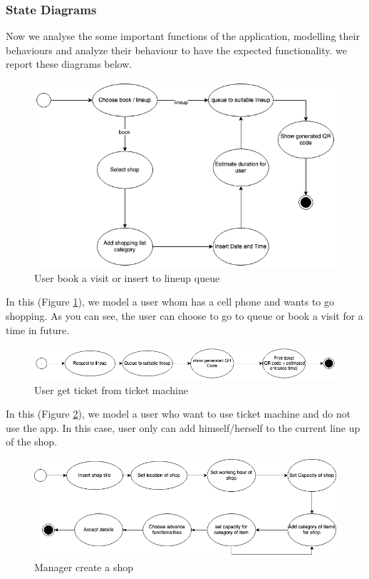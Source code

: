 \subsubsection{State Diagrams}
Now we analyse the some important functions of the application, modelling their behaviours and analyze their behaviour to have the expected functionality. we report these diagrams below. \\

\begin{figure}[H]
  \includegraphics[width=\textwidth,height=\textheight,keepaspectratio]{images/bookLineup.png}
  \caption{User book a visit or insert to lineup queue}
  \label{fig:bookLineup}
\end{figure}

In this (Figure \ref{fig:bookLineup}), we model a user whom has a cell phone and wants to go shopping. As you can see, the user can choose to go to queue or book a visit for a time in future.

\begin{figure}[H]
  \includegraphics[width=\textwidth,height=\textheight,keepaspectratio]{images/OfflineTicket.png}
  \caption{User get ticket from ticket machine}
  \label{fig:OfflineTicket}
\end{figure}

In this (Figure \ref{fig:OfflineTicket}), we model a user who want to use ticket machine and do not use the app. In this case, user only can add himself/herself to the current line up of the shop.

\begin{figure}[H]
  \includegraphics[width=\textwidth,height=\textheight,keepaspectratio]{images/CreateShop.png}
  \caption{Manager create a shop}
  \label{fig:CreateShop}
\end{figure}


